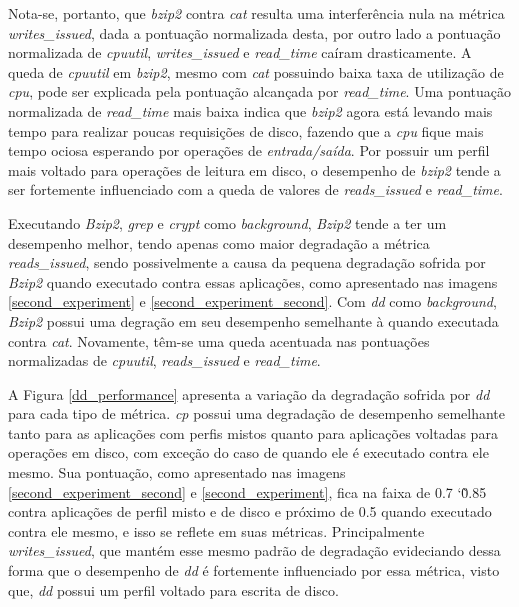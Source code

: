Nota-se, portanto, que \textit{bzip2} contra \textit{cat} resulta uma interferência nula na métrica \textit{writes\_issued}, dada a pontuação normalizada desta, por outro lado a pontuação normalizada de \textit{cpuutil}, \textit{writes\_issued} e \textit{read\_time} caíram drasticamente. A queda de \textit{cpuutil} em \textit{bzip2}, mesmo com \textit{cat} possuindo baixa taxa de utilização de \textit{cpu}, pode ser explicada pela pontuação alcançada por \textit{read\_time}. Uma pontuação normalizada de \textit{read\_time} mais baixa indica que \textit{bzip2} agora está levando mais tempo para realizar poucas requisições de disco, fazendo que a \textit{cpu} fique mais tempo ociosa esperando por operações de \textit{entrada/saída}. Por possuir um perfil mais voltado para operações de leitura em disco, o desempenho de \textit{bzip2} tende a ser fortemente influenciado com a queda de valores de \textit{reads\_issued} e \textit{read\_time}.

Executando \textit{Bzip2}, \textit{grep} e \textit{crypt} como \textit{background}, \textit{Bzip2} tende a ter um desempenho melhor, tendo apenas como maior degradação a métrica \textit{reads\_issued}, sendo possivelmente a causa da pequena degradação sofrida por \textit{Bzip2} quando executado contra essas aplicações, como apresentado nas imagens \ref{second_experiment} e \ref{second_experiment_second}. Com \textit{dd} como \textit{background}, \textit{Bzip2} possui uma degração em seu desempenho semelhante à quando executada contra \textit{cat}. Novamente, têm-se uma queda acentuada nas pontuações normalizadas de \textit{cpuutil}, \textit{reads\_issued} e \textit{read\_time}.

A Figura \ref{dd_performance} apresenta a variação da degradação sofrida por \textit{dd} para cada tipo de métrica. \textit{cp} possui uma degradação de desempenho semelhante tanto para as aplicações com perfis mistos  quanto para aplicações voltadas para operações em disco, com exceção do caso de quando ele é executado contra ele mesmo. Sua pontuação, como apresentado nas imagens \ref{second_experiment_second} e \ref{second_experiment}, fica na faixa de 0.7 \char`\~  0.85 contra aplicações de perfil misto e de disco e próximo de 0.5 quando executado contra ele mesmo, e isso se reflete em suas métricas. Principalmente \textit{writes\_issued}, que mantém esse mesmo padrão de degradação evideciando dessa forma que o desempenho de \textit{dd} é fortemente influenciado por essa métrica, visto que, \textit{dd} possui um perfil voltado para escrita de disco.
 
